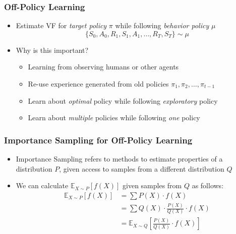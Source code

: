 \documentclass[handout]{beamer}
\begin{document}
\begin{frame}
\frametitle{Off-Policy Learning}
\pause
\begin{itemize}[<+->]
\item Estimate VF for {\em target policy} $\pi$  while following {\em behavior policy} $\mu$
$$\{S_0, A_0, R_1, S_1, A_1, \ldots, R_T, S_T\} \sim \mu$$
\item Why is this important?
\begin{itemize}[<+->]
\item Learning from observing  humans or other agents
\item Re-use experience generated from  old policies  $\pi_1, \pi_2, \ldots, \pi_{t-1}$
\item Learn about {\em optimal} policy while following {\em exploratory} policy
\item Learn about {\em multiple} policies while following {\em one} policy
\end{itemize}
\end{itemize}
\end{frame}

\begin{frame}
\frametitle{Importance Sampling for Off-Policy Learning}
\pause
\begin{itemize}[<+->]
\item Importance Sampling refers to methods to estimate properties of a distribution $P$, given access to samples from a different distribution $Q$
\item We can calculate $\mathbb{E}_{X\sim P}[f(X)]$ given samples from $Q$ as follows:
\begin{align*}
\mathbb{E}_{X\sim P}[f(X)] & = \sum P(X) \cdot f(X) \\
& = \sum Q(X) \cdot \frac {P(X)} {Q(X)} \cdot f(X) \\
& = \mathbb{E}_{X \sim Q}[\frac {P(X)} {Q(X)} \cdot f(X)]
\end{align*}
\end{itemize}
\end{frame}
\end{document}

